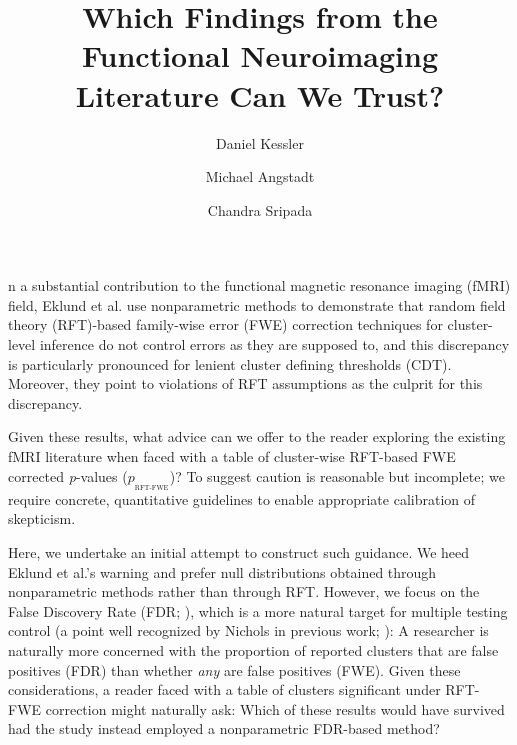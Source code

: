 \documentclass[9pt,twocolumn,twoside]{pnas-new}
\title{Which Findings from the Functional Neuroimaging Literature Can We Trust?}
\author[a,1,2]{Daniel Kessler}
\author[a,1]{Michael Angstadt}
\author[a,1]{Chandra Sripada}
\affil[a]{Department of Psychiatry, University of Michigan, Ann Arbor}
\newcommand{\subtext}[2]{
#1_{_{\text{#2}}}
}
\begin{document}
\verticaladjustment{-2pt}

\maketitle
\thispagestyle{firststyle}




n a substantial contribution to the functional magnetic resonance imaging (fMRI) field, Eklund et al. \cite{eklund_cluster_2016} use nonparametric methods to demonstrate that random field theory (RFT)-based family-wise error (FWE) correction techniques for cluster-level inference do not control errors as they are supposed to, and this discrepancy is particularly pronounced for lenient cluster defining thresholds (CDT). 
Moreover, they point to violations of RFT assumptions as the culprit for this discrepancy.

Given these results, what advice can we offer to the reader exploring the existing fMRI literature when faced with a table of cluster-wise RFT-based FWE corrected \textit{p}-values ($\subtext{p}{RFT-FWE}$)? 
To suggest caution is reasonable but incomplete; we require concrete, quantitative guidelines to enable appropriate calibration of skepticism.

Here, we undertake an initial attempt to construct such guidance.
We heed Eklund et al.'s warning and prefer null distributions obtained through nonparametric methods rather than through RFT.
However, we focus on the False Discovery Rate (FDR; \cite{benjamini_controlling_1995}), which is a more natural target for multiple testing control (a point well recognized by Nichols in previous work; \cite{genovese_thresholding_2002}):
A researcher is naturally more concerned with the proportion of reported clusters that are false positives (FDR) than whether \textit{any} are false positives (FWE).
Given these considerations, a reader faced with a table of clusters significant under RFT-FWE correction might naturally ask: Which of these results would have survived had the study instead employed a nonparametric FDR-based method?
\end{document}
